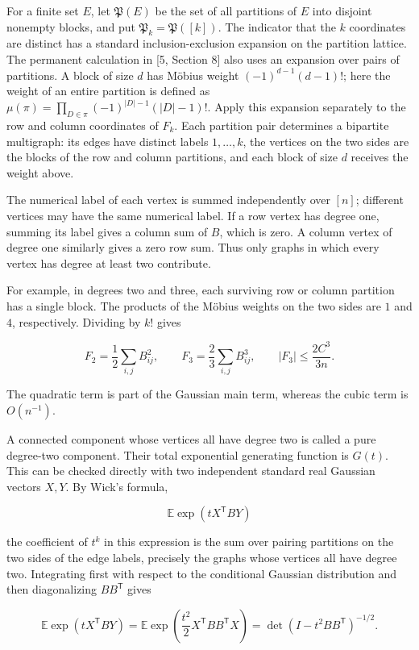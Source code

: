 \documentclass[11pt,a4paper]{article}
\begin{document}
For a finite set \(E\), let \(\mathfrak P(E)\) be the set of all partitions of \(E\) into disjoint nonempty blocks, and put \(\mathfrak P_k=\mathfrak P([k])\). The indicator that the \(k\) coordinates are distinct has a standard inclusion-exclusion expansion on the partition lattice. The permanent calculation in {[}5, Section 8{]} also uses an expansion over pairs of partitions. A block of size \(d\) has Möbius weight \((-1)^{d-1}(d-1)!\); here the weight of an entire partition is defined as \(\mu(\pi)=\prod_{D\in\pi}(-1)^{|D|-1}(|D|-1)!\). Apply this expansion separately to the row and column coordinates of \(F_k\). Each partition pair determines a bipartite multigraph: its edges have distinct labels \(1,\ldots,k\), the vertices on the two sides are the blocks of the row and column partitions, and each block of size \(d\) receives the weight above.

The numerical label of each vertex is summed independently over \([n]\); different vertices may have the same numerical label. If a row vertex has degree one, summing its label gives a column sum of \(B\), which is zero. A column vertex of degree one similarly gives a zero row sum. Thus only graphs in which every vertex has degree at least two contribute.

For example, in degrees two and three, each surviving row or column partition has a single block. The products of the Möbius weights on the two sides are \(1\) and \(4\), respectively. Dividing by \(k!\) gives

\[
F_2=\frac12\sum_{i,j}B_{ij}^2,
\qquad
F_3=\frac23\sum_{i,j}B_{ij}^3,
\qquad |F_3|\le\frac{2C^3}{3n}.
\]

The quadratic term is part of the Gaussian main term, whereas the cubic term is \(O(n^{-1})\).

A connected component whose vertices all have degree two is called a pure degree-two component. Their total exponential generating function is \(G(t)\). This can be checked directly with two independent standard real Gaussian vectors \(X,Y\). By Wick's formula,

\[
\mathbb E\exp(tX^{\mathsf T}BY)
\]

the coefficient of \(t^k\) in this expression is the sum over pairing partitions on the two sides of the edge labels, precisely the graphs whose vertices all have degree two. Integrating first with respect to the conditional Gaussian distribution and then diagonalizing \(BB^{\mathsf T}\) gives

\[
\mathbb E\exp(tX^{\mathsf T}BY)
=\mathbb E\exp\!\left(\frac{t^2}{2}X^{\mathsf T}BB^{\mathsf T}X\right)
=\det(I-t^2BB^{\mathsf T})^{-1/2}.
\]
\end{document}
